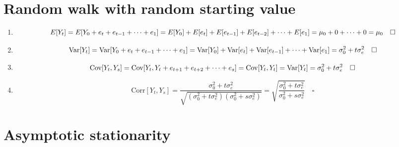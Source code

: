 \documentclass[]{book}
\providecommand{\tightlist}{%
  \setlength{\itemsep}{0pt}\setlength{\parskip}{0pt}}
\begin{document}
\section{Random walk with random starting
value}\label{random-walk-with-random-starting-value}

\begin{enumerate}
\def\labelenumi{(\alph{enumi})}
\tightlist
\item
  \[
    E[Y_t] = E[Y_0+e_t+e_{t-1}+\dots+e_1] = \\
    E[Y_0] + E[e_t] + E[e_{t-1}] + E[e_{t-2}] + \dots + E[e_1] = \\
    \mu_0 + 0 + \dots + 0 = \mu_0 \quad \square
  \]
\item
  \[
    \text{Var}[Y_t] = \text{Var}[Y_0 + e_t + e_{t-1} + \dots + e_1] = \\
    \text{Var}[Y_0] + \text{Var}[e_t] + \text{Var}[e_{t-1}] + \dots + \text{Var}[e_1] = \\
    \sigma_0^2+t\sigma_e^2 \quad \square
  \]
\item
  \[
    \text{Cov}[Y_t, Y_s] = \text{Cov}[Y_t, Y_t+e_{t+1}+e_{t+2}+ \dots + e_s] = \\
    \text{Cov}[Y_t, Y_t] = \text{Var}[Y_t] = \sigma_0^2+t\sigma_e^2 \quad \square
  \]
\item
  \[
    \text{Corr}[Y_t, Y_s] = \frac{\sigma_0^2+t\sigma_e^2}{\sqrt{(\sigma_0^2+t\sigma_e^2)(\sigma_0^2+s\sigma_e^2)}} = 
      \sqrt{\frac{\sigma_0^2+t\sigma_e^2}{\sigma_0^2+s\sigma_e^2}} \quad \square
  \]
\end{enumerate}

\section{Asymptotic stationarity}\label{asymptotic-stationarity}
\end{document}
